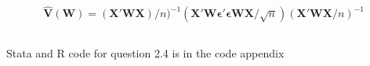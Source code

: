 \documentclass[12pt]{article}
\begin{document}
\begin{equation}
\mathbf{\hat{V}(W) = (X'WX) }/n)^{-1} (\mathbf{X'W\epsilon'\epsilon WX}/\sqrt{n})(\mathbf{X'WX}/n)^{-1}
\end{equation}

\subsection{}
 Stata and R code for question 2.4 is in the code appendix

\subsection{}

\subsubsection{}
\end{document}
